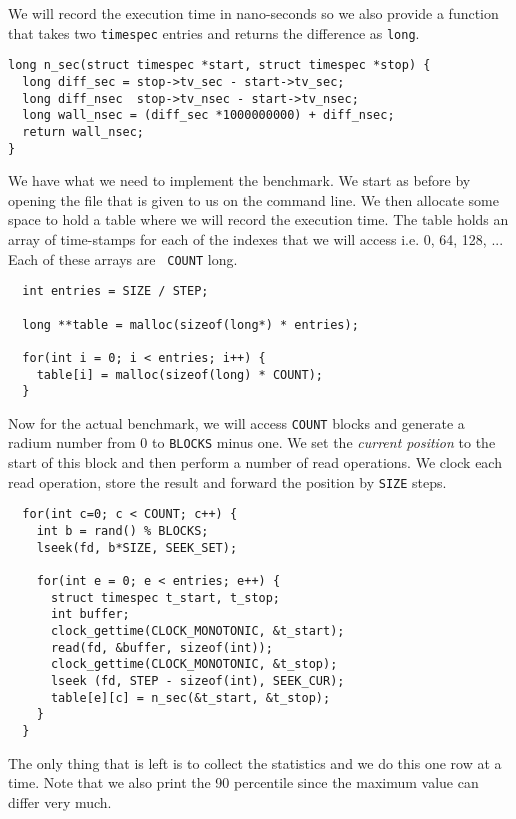 \documentclass[a4paper,11pt]{article}
\begin{document}
We will record the execution time in nano-seconds so we also provide a
function that takes two {\tt timespec} entries and returns the
difference as {\tt long}.

\begin{lstlisting}
long n_sec(struct timespec *start, struct timespec *stop) {
  long diff_sec = stop->tv_sec - start->tv_sec;
  long diff_nsec  stop->tv_nsec - start->tv_nsec;
  long wall_nsec = (diff_sec *1000000000) + diff_nsec;
  return wall_nsec;
}
\end{lstlisting}

We have what we need to implement the benchmark. We start as before
by opening the file that is given to us on the command line. We then
allocate some space to hold a table where we will record the execution
time. The table holds an array of time-stamps for each of the indexes
that we will access i.e. 0, 64, 128, ... Each of these arrays are {\tt
  COUNT} long.

\begin{lstlisting}
  int entries = SIZE / STEP;

  long **table = malloc(sizeof(long*) * entries);

  for(int i = 0; i < entries; i++) {
    table[i] = malloc(sizeof(long) * COUNT);
  }
\end{lstlisting}

Now for the actual benchmark, we will access {\tt COUNT} blocks and
generate a radium number from $0$ to {\tt BLOCKS} minus one. We set the
{\em current position} to the start of this block and then perform a
number of read operations. We clock each read operation, store the
result and forward the position by {\tt SIZE} steps.

\begin{lstlisting}
  for(int c=0; c < COUNT; c++) {
    int b = rand() % BLOCKS;
    lseek(fd, b*SIZE, SEEK_SET);

    for(int e = 0; e < entries; e++) {
      struct timespec t_start, t_stop;
      int buffer;
      clock_gettime(CLOCK_MONOTONIC, &t_start);
      read(fd, &buffer, sizeof(int));
      clock_gettime(CLOCK_MONOTONIC, &t_stop);
      lseek (fd, STEP - sizeof(int), SEEK_CUR);
      table[e][c] = n_sec(&t_start, &t_stop);
    }
  }
\end{lstlisting}

The only thing that is left is to collect the statistics and we do
this one row at a time. Note that we also print the 90 percentile
since the maximum value can differ very much.
\end{document}
